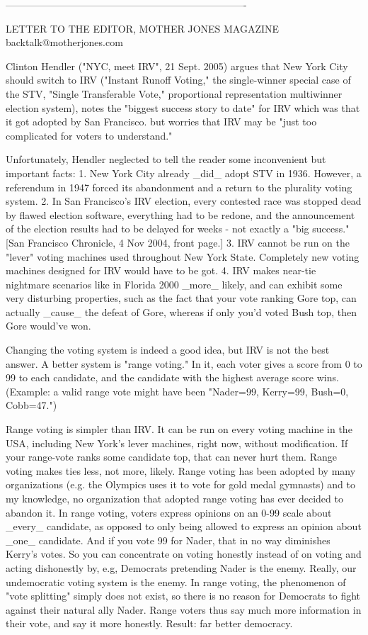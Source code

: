 -------------------------------------------------------------------------

LETTER TO THE EDITOR, MOTHER JONES MAGAZINE   backtalk@motherjones.com

Clinton Hendler ("NYC, meet IRV", 21 Sept. 2005)
argues that New York City should switch to IRV
("Instant Runoff Voting," the single-winner special case of
the STV, "Single Transferable Vote," proportional representation
multiwinner election system), notes the "biggest success story to date"
for IRV which was that it got adopted by San Francisco.
but worries that IRV may be "just too complicated for voters to understand."

Unfortunately, Hendler neglected to tell the reader some
inconvenient but important facts:
1. New York City already _did_ adopt STV in 1936. 
However, a referendum in 1947 forced its abandonment and a return
to the plurality voting system.
2. In San Francisco's IRV election, every contested race was stopped dead
by flawed election software, everything had to be redone, and the announcement of
the election results had to be delayed for weeks - not exactly a "big success."
[San Francisco Chronicle, 4 Nov 2004, front page.]
3. IRV cannot be run on the "lever" voting machines used throughout New York State.  
Completely new voting machines designed for IRV would have to be got.
4. IRV makes near-tie nightmare scenarios like in Florida 2000 _more_ likely,
and can exhibit some very disturbing properties, such as the fact that your vote ranking
Gore top, can actually _cause_ the defeat of Gore, whereas if only you'd voted Bush top,
then Gore would've won.

Changing the voting system is indeed a good idea, but IRV is not the best answer.
A better system is "range voting."
In it, each voter gives a score from 0 to 99 to each candidate, and the candidate with
the highest average score wins.  (Example: a valid range vote might have been
"Nader=99, Kerry=99, Bush=0, Cobb=47.")  

Range voting is simpler than IRV.   
It can be run on every voting machine in the USA, including New York's lever machines,
right now, without modification.  
If your range-vote ranks some candidate top, that can never hurt them.
Range voting makes ties less, not more, likely.  
Range voting has been adopted by many organizations (e.g. the Olympics uses it to
vote for gold medal gymnasts) and to my knowledge,
no organization that adopted range voting has ever decided to abandon it.
In range voting, voters express opinions on an 0-99 scale about _every_ candidate,
as opposed to only being allowed to express an opinion about _one_ candidate.
And if you vote 99 for Nader, that in no way diminishes Kerry's votes. 
So you can concentrate on voting honestly instead of
on voting and acting dishonestly by, e.g, Democrats pretending Nader is the enemy.  
Really, our undemocratic voting system is the enemy.  In range voting, the phenomenon
of "vote splitting" simply does not exist, so there is no reason for Democrats to
fight against their natural ally Nader.   Range voters thus say much more
information in their vote, and say it more honestly.  Result: far better democracy.

